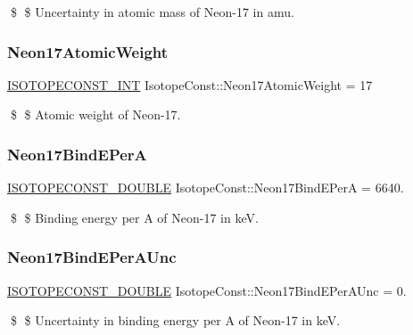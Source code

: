 \$ \$ Uncertainty in atomic mass of Neon-\/17 in amu. \mbox{\label{group___isotope_const-_neon-_ne17_ga96610086b122f2487217b7e44ae60d33}} 
\subsubsection{\texorpdfstring{Neon17\+Atomic\+Weight}{Neon17AtomicWeight}}
{\footnotesize\ttfamily \mbox{\hyperlink{group___isotope_const-_macros_ga5f18360b3e99483a35c32d789e62621c}{I\+S\+O\+T\+O\+P\+E\+C\+O\+N\+S\+T\+\_\+\+I\+NT}} Isotope\+Const\+::\+Neon17\+Atomic\+Weight = 17}

\$ \$ Atomic weight of Neon-\/17. \mbox{\label{group___isotope_const-_neon-_ne17_ga216ae76663f29884c6eb011e522f585c}} 
\subsubsection{\texorpdfstring{Neon17\+Bind\+E\+PerA}{Neon17BindEPerA}}
{\footnotesize\ttfamily \mbox{\hyperlink{group___isotope_const-_macros_ga8f45a7272ce02c0b4c65c44636ed719a}{I\+S\+O\+T\+O\+P\+E\+C\+O\+N\+S\+T\+\_\+\+D\+O\+U\+B\+LE}} Isotope\+Const\+::\+Neon17\+Bind\+E\+PerA = 6640.}

\$ \$ Binding energy per A of Neon-\/17 in keV. \mbox{\label{group___isotope_const-_neon-_ne17_gaad94dbc38f2145e2badf2f65f7ef7fd6}} 
\subsubsection{\texorpdfstring{Neon17\+Bind\+E\+Per\+A\+Unc}{Neon17BindEPerAUnc}}
{\footnotesize\ttfamily \mbox{\hyperlink{group___isotope_const-_macros_ga8f45a7272ce02c0b4c65c44636ed719a}{I\+S\+O\+T\+O\+P\+E\+C\+O\+N\+S\+T\+\_\+\+D\+O\+U\+B\+LE}} Isotope\+Const\+::\+Neon17\+Bind\+E\+Per\+A\+Unc = 0.}

\$ \$ Uncertainty in binding energy per A of Neon-\/17 in keV. \mbox{\label{group___isotope_const-_neon-_ne17_ga3c92436846e7e331b370dc4b63b84870}} 
